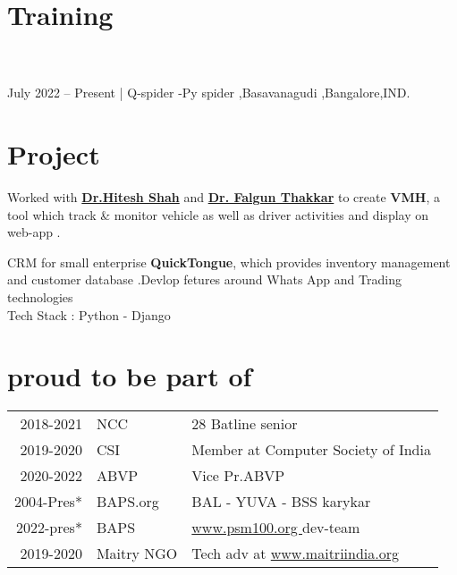 \documentclass[]{deedy-resume-openfont}
\begin{document}
\begin{minipage}[t]{0.66\textwidth}
\section{ Training }\\
 \\
 July 2022 – Present | Q-spider -Py spider ,Basavanagudi ,Bangalore,IND.
\sectionsep
\section{Project}
Worked with \textbf{\href{https://www.gcet.ac.in/staffdetails.php?fid=VDA0NA==}{Dr.Hitesh Shah}} and \textbf{\href{https://www.gcet.ac.in/staffdetails.php?fid=VDE2NA==}{Dr. Falgun Thakkar}} to create \textbf{VMH}, a tool which  track \& monitor vehicle  as well as driver activities and display on web-app . 
\sectionsep

CRM for small enterprise \textbf{QuickTongue}, which provides inventory management and customer database .Devlop fetures around Whats App and Trading technologies  \\
Tech Stack : Python - Django \\




\section{proud to be part of} 
\begin{tabular}{rll}
2018-2021	     &NCC   & 28 Batline senior\\
2019-2020	     &CSI  & Member at Computer Society of India\\
2020-2022	     &ABVP  & Vice Pr.ABVP \\
2004-Pres*     &BAPS.org  & BAL - YUVA - BSS karykar   \\
2022-pres*     & BAPS     & \href{https://psm100.org/}{www.psm100.org } dev-team  \\
2019-2020     & Maitry NGO & Tech adv at \href{https://www.maitriindia.org/}{www.maitriindia.org }  \\
\end{tabular}
\sectionsep


\end{minipage}
\end{document}

